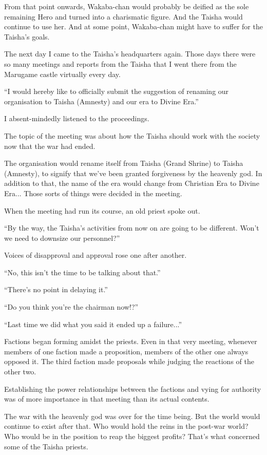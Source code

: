 From that point onwards, Wakaba-chan would probably be deified as the sole remaining Hero and turned into a charismatic figure. And the Taisha would continue to use her. And at some point, Wakaba-chan might have to suffer for the Taisha's goals.

The next day I came to the Taisha's headquarters again. Those days there were so many meetings and reports from the Taisha that I went there from the Marugame castle virtually every day.

``I would hereby like to officially submit the suggestion of renaming our organisation to Taisha (Amnesty) and our era to Divine Era.''

I absent-mindedly listened to the proceedings.

The topic of the meeting was about how the Taisha should work with the society now that the war had ended.

The organisation would rename itself from Taisha (Grand Shrine) to Taisha (Amnesty), to signify that we've been granted forgiveness by the heavenly god. In addition to that, the name of the era would change from Christian Era to Divine Era... Those sorts of things were decided in the meeting.

When the meeting had run its course, an old priest spoke out.

``By the way, the Taisha's activities from now on are going to be different. Won't we need to downsize our personnel?''

Voices of disapproval and approval rose one after another.

``No, this isn't the time to be talking about that.''

``There's no point in delaying it.''

``Do you think you're the chairman now!?''

``Last time we did what you said it ended up a failure...''

Factions began forming amidst the priests. Even in that very meeting, whenever members of one faction made a proposition, members of the other one always opposed it. The third faction made proposals while judging the reactions of the other two.

Establishing the power relationships between the factions and vying for authority was of more importance in that meeting than its actual contents.

The war with the heavenly god was over for the time being. But the world would continue to exist after that. Who would hold the reins in the post-war world? Who would be in the position to reap the biggest profits? That's what concerned some of the Taisha priests.

